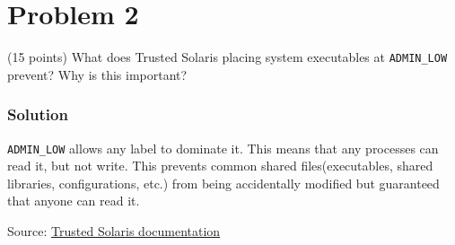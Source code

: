 \section*{Problem 2}
 (15 points) What does Trusted Solaris placing system executables at \texttt{ADMIN\_LOW} prevent? Why is this important?

\subsubsection*{Solution}

\texttt{ADMIN\_LOW} allows any label to dominate it.
This means that any processes can read it, but not write.
This prevents common shared files(executables, shared libraries, configurations, etc.) from being accidentally modified but guaranteed that anyone can read it.

Source: \href{https://docs.oracle.com/cd/E19109-01/tsolaris8/816-1047/6m7g9esu9/index.html}{Trusted Solaris documentation}